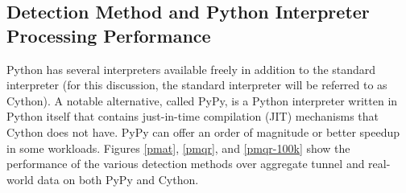\documentclass{llncs}
\begin{document}
\subsection{Detection Method and Python Interpreter Processing Performance}
\label{processing-perf}
Python has several interpreters available freely in addition to the standard
interpreter (for this discussion, the standard interpreter will be referred to
as Cython). A notable alternative, called PyPy, is a Python interpreter written
in Python itself that contains just-in-time compilation (JIT) mechanisms that
Cython does not have. PyPy can offer an order of magnitude
or better speedup\cite{pypyvc-strfmt} in some workloads. Figures \ref{pmat}, \ref{pmqr}, and \ref{pmqr-100k} show
the performance of the various detection methods over aggregate tunnel and
real-world data on both PyPy and Cython.

%
\end{document}
